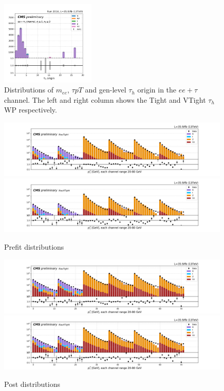 \begin{figure}
    \includegraphics[width=0.4\textwidth]{chapters/Appendix/sectionJetToTauh/figures/eetau_tauGenFlavor_pickles_lltauVTight.png}
    \caption{Distributions of $m_{ee}$, $\tau pT$ and gen-level $\tau_h$ origin in the $ee+\tau$ channel. The left and right column shows the Tight and VTight $\tau_h$ WP respectively.}
    \label{fig:appendix:fakeTauId:eetau}
\end{figure}


\begin{figure}
    \centering
    \includegraphics[width=0.99\textwidth]{chapters/Appendix/sectionJetToTauh/figures/2020_tauID_prefit_lltauTight.png}
    \includegraphics[width=0.99\textwidth]{chapters/Appendix/sectionJetToTauh/figures/2020_tauID_prefit_lltauVTight.png}
    \caption{Prefit distributions}
    \label{fig:appendix:fakeTauId:prefit}
\end{figure}

\begin{figure}
    \centering
    \includegraphics[width=0.99\textwidth]{chapters/Appendix/sectionJetToTauh/figures/2020_tauID_postfit_lltauTight.png}
    \includegraphics[width=0.99\textwidth]{chapters/Appendix/sectionJetToTauh/figures/2020_tauID_postfit_lltauVTight.png}
    \caption{Post distributions}
    \label{fig:appendix:fakeTauId:postfit}
\end{figure}



